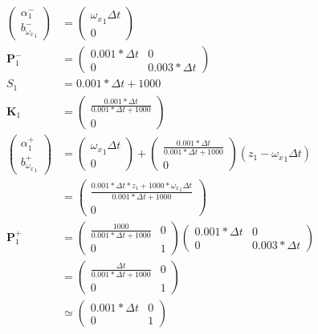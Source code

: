 \begin{align}
  \begin{pmatrix}
    \alpha_{1}^{-}\\
    b_{{\omega_x}_{1}}^{-}
  \end{pmatrix} &=
  \begin{pmatrix}
    {\omega_x}_{1} \Delta t\\
    0
  \end{pmatrix}\\
  \boldsymbol{P}_{1}^{-} &=
  \begin{pmatrix}
    0.001 * \Delta t & 0\\
    0 & 0.003 * \Delta t
  \end{pmatrix}\\
  S_{1} &= 0.001 * \Delta t + 1000\\
  \boldsymbol{K}_{1} &=
  \begin{pmatrix}
    \frac{0.001 * \Delta t}{0.001 * \Delta t + 1000}\\
    0
  \end{pmatrix}\\
  \begin{pmatrix}
    \alpha_{1}^{+}\\
    b_{{\omega_x}_{1}}^{+}
  \end{pmatrix} &=
  \begin{pmatrix}
    {\omega_x}_{1} \Delta t\\
    0
  \end{pmatrix} +
  \begin{pmatrix}
    \frac{0.001 * \Delta t}{0.001 * \Delta t + 1000}\\
    0
  \end{pmatrix}
  \left(z_{1} - {\omega_x}_{1} \Delta t\right)\\
  &=
  \begin{pmatrix}
    \frac{0.001 * \Delta t * z_{1} + 1000 * {\omega_x}_{1} \Delta t}{0.001 * \Delta t + 1000}\\
    0
  \end{pmatrix}\\
  \boldsymbol{P}_{1}^{+} &=
  \begin{pmatrix}
    \frac{1000}{0.001 * \Delta t + 1000} & 0\\
    0 & 1
  \end{pmatrix}
  \begin{pmatrix}
    0.001 * \Delta t & 0\\
    0 & 0.003 * \Delta t
  \end{pmatrix}\\
  &=
  \begin{pmatrix}
    \frac{\Delta t}{0.001 * \Delta t + 1000} & 0\\
    0 & 1
  \end{pmatrix}\\
  &\simeq
  \begin{pmatrix}
    0.001 * \Delta t & 0\\
    0 & 1
  \end{pmatrix}
\end{align}
